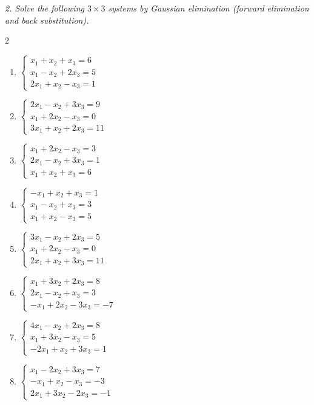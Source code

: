 \emph{2. Solve the following $3\times 3$ systems by Gaussian elimination (forward elimination and back substitution).}
\bigskip
\begin{multicols}{2}\raggedright
\begin{enumerate}[label=\arabic*., leftmargin=*]

\item $\begin{cases}x_1+x_2+x_3=6\\x_1-x_2+2x_3=5\\2x_1+x_2-x_3=1\end{cases}$

\item $\begin{cases}2x_1-x_2+3x_3=9\\x_1+2x_2-x_3=0\\3x_1+x_2+2x_3=11\end{cases}$

\item $\begin{cases}x_1+2x_2-x_3=3\\2x_1-x_2+3x_3=1\\x_1+x_2+x_3=6\end{cases}$

\item $\begin{cases}-x_1+x_2+x_3=1\\x_1-x_2+x_3=3\\x_1+x_2-x_3=5\end{cases}$

\item $\begin{cases}3x_1-x_2+2x_3=5\\x_1+2x_2-x_3=0\\2x_1+x_2+3x_3=11\end{cases}$

\item $\begin{cases}x_1+3x_2+2x_3=8\\2x_1-x_2+x_3=3\\-x_1+2x_2-3x_3=-7\end{cases}$

\item $\begin{cases}4x_1-x_2+2x_3=8\\x_1+3x_2-x_3=5\\-2x_1+x_2+3x_3=1\end{cases}$

\item $\begin{cases}x_1-2x_2+3x_3=7\\-x_1+x_2-x_3=-3\\2x_1+3x_2-2x_3=-1\end{cases}$


\end{enumerate}
\end{multicols}
